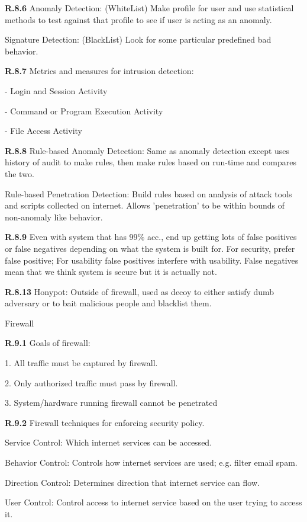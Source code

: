 \documentclass{report}
\begin{document}
{\bf R.8.6}
Anomaly Detection: (WhiteList) Make profile for user and use statistical methods to test
against that profile to see if user is acting as an anomaly.

Signature Detection: (BlackList) Look for some particular predefined bad
behavior.

{\bf R.8.7}
Metrics and measures for intrusion detection:

- Login and Session Activity

- Command or Program Execution Activity

- File Access Activity

{\bf R.8.8}
Rule-based Anomaly Detection: Same as anomaly detection except uses history of
audit to make rules, then make rules based on run-time and compares the two.

Rule-based Penetration Detection: Build rules based on analysis of attack tools
and scripts collected on internet. Allows 'penetration' to be within bounds of
non-anomaly like behavior.

{\bf R.8.9}
Even with system that has 99\% acc., end up getting lots of false positives or
false negatives depending on what the system is built for. For security, prefer
false positive; For usability false positives interfere with usability. False
negatives mean that we think system is secure but it is actually not.

{\bf R.8.13}
Honypot: Outside of firewall, used as decoy to either satisfy dumb adversary or
to bait malicious people and blacklist them.



\large{Firewall}

{\bf R.9.1}
Goals of firewall:

1. All traffic must be captured by firewall.

2. Only authorized traffic must pass by firewall.

3. System/hardware running firewall cannot be penetrated

{\bf R.9.2}
Firewall techniques for enforcing security policy.

Service Control: Which internet services can be accessed.

Behavior Control: Controls how internet services are used; e.g. filter email spam.

Direction Control: Determines direction that internet service can flow.

User Control: Control access to internet service based on the user trying to
access it.
\end{document}
